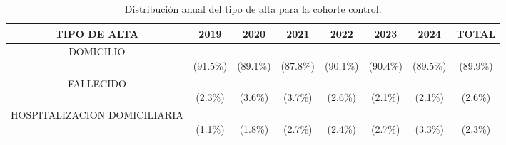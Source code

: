 \begin{table}[htbp]
\centering
\scriptsize
\setlength{\tabcolsep}{4pt}
\renewcommand{\arraystretch}{1.4}
\caption{Distribución anual del tipo de alta para la cohorte control.}
\label{tab:frecuencia_tipo_alta_control}
\begin{tabular}{|c|c|c|c|c|c|c|c|}
\hline
\parbox[t]{4.0cm}{\centering\textbf{TIPO DE ALTA}} & 
\parbox[t]{1.2cm}{\centering\textbf{2019}} & 
\parbox[t]{1.2cm}{\centering\textbf{2020}} & 
\parbox[t]{1.2cm}{\centering\textbf{2021}} & 
\parbox[t]{1.2cm}{\centering\textbf{2022}} & 
\parbox[t]{1.2cm}{\centering\textbf{2023}} & 
\parbox[t]{1.2cm}{\centering\textbf{2024}} & 
\parbox[t]{1.6cm}{\centering\textbf{TOTAL}} \\ \hline
\parbox[t]{4.0cm}{\raggedright DOMICILIO} & \parbox[t]{1.2cm}{\\(91.5\%)} & \parbox[t]{1.2cm}{\\(89.1\%)} & \parbox[t]{1.2cm}{\\(87.8\%)} & \parbox[t]{1.2cm}{\\(90.1\%)} & \parbox[t]{1.2cm}{\\(90.4\%)} & \parbox[t]{1.2cm}{\\(89.5\%)} & \parbox[t]{1.6cm}{\\(89.9\%)} \\ \hline
\parbox[t]{4.0cm}{\raggedright FALLECIDO} & \parbox[t]{1.2cm}{\\(2.3\%)} & \parbox[t]{1.2cm}{\\(3.6\%)} & \parbox[t]{1.2cm}{\\(3.7\%)} & \parbox[t]{1.2cm}{\\(2.6\%)} & \parbox[t]{1.2cm}{\\(2.1\%)} & \parbox[t]{1.2cm}{\\(2.1\%)} & \parbox[t]{1.6cm}{\\(2.6\%)} \\ \hline
\parbox[t]{4.0cm}{\raggedright HOSPITALIZACION DOMICILIARIA} & \parbox[t]{1.2cm}{\\(1.1\%)} & \parbox[t]{1.2cm}{\\(1.8\%)} & \parbox[t]{1.2cm}{\\(2.7\%)} & \parbox[t]{1.2cm}{\\(2.4\%)} & \parbox[t]{1.2cm}{\\(2.7\%)} & \parbox[t]{1.2cm}{\\(3.3\%)} & \parbox[t]{1.6cm}{\\(2.3\%)} \\ \hline

\end{tabular}
\end{table}
